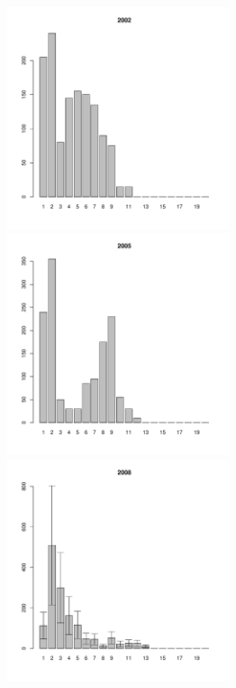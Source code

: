 \documentclass[12pt, a4paper]{article}
\begin{document}
\begin{figure}[h]
\begin{multicols}{3}
\hfill
\includegraphics[width=65mm]{../White_Sea/Luvenga_Goreliy/middle_2002_.pdf}
\hfill
\includegraphics[width=65mm]{../White_Sea/Luvenga_Goreliy/middle_2005_.pdf}
\hfill
\includegraphics[width=65mm]{../White_Sea/Luvenga_Goreliy/middle_2008_.pdf}
\end{multicols}




\end{figure}
\end{document}
